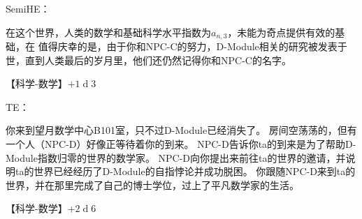 \documentclass[12pt]{report}
\begin{document}
\color{green}
SemiHE：

\color{black}
在这个世界，人类的数学和基础科学水平指数为$a_{n,3}$，未能为奇点提供有效的基础，在
值得庆幸的是，由于你和NPC-C的努力，D-Module相关的研究被发表于世，直到人类最后的岁月里，他们还仍然记得你和NPC-C的名字。

\color{purple}【科学-数学】$+1\operatorname{d}3$

\color{green}
TE：

\color{black}
你来到望月数学中心B101室，只不过D-Module已经消失了。
房间空荡荡的，但有一个人（NPC-D）好像正等待着你的到来。
NPC-D告诉你ta的到来是为了帮助D-Module指数归零的世界的数学家。
NPC-D向你提出来前往ta的世界的邀请，并说明ta的世界已经经历了D-Module的自指悖论并成功脱困。
你跟随NPC-D来到ta的世界，并在那里完成了自己的博士学位，过上了平凡数学家的生活。

\color{purple}【科学-数学】$+2\operatorname{d}6$
\end{document}
